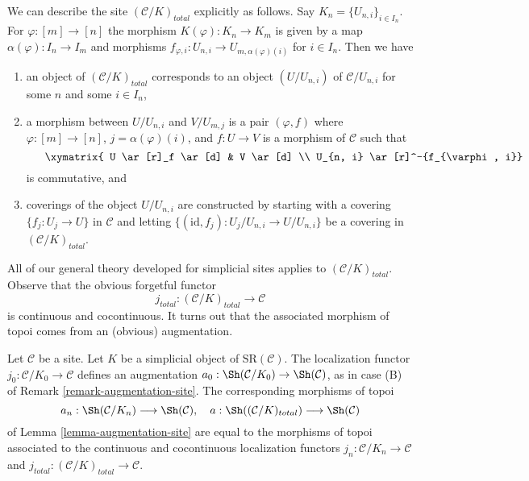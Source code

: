 \medskip\noindent
We can describe the site $(\mathcal{C}/K)_{total}$ explicitly as follows.
Say $K_n = \{U_{n, i}\}_{i \in I_n}$. For $\varphi : [m] \to [n]$
the morphism $K(\varphi) : K_n \to K_m$ is given by a map
$\alpha(\varphi) : I_n \to I_m$ and morphisms
$f_{\varphi, i} : U_{n, i} \to U_{m, \alpha(\varphi)(i)}$ for $i \in I_n$.
Then we have
\begin{enumerate}
\item an object of $(\mathcal{C}/K)_{total}$
corresponds to an object $(U/U_{n, i})$
of $\mathcal{C}/U_{n, i}$ for some $n$ and some $i \in I_n$,
\item a morphism between $U/U_{n, i}$ and $V/U_{m, j}$
is a pair $(\varphi, f)$ where $\varphi : [m] \to [n]$,
$j = \alpha(\varphi)(i)$, and $f : U \to V$ is a morphism of
$\mathcal{C}$ such that
$$
\vcenter{
\xymatrix{
U \ar[r]_f \ar[d] & V \ar[d] \\
U_{n, i} \ar[r]^-{f_{\varphi, i}} &
U_{m, j}
}
}
$$
is commutative, and
\item coverings of the object $U/U_{n, i}$ are constructed
by starting with a covering $\{f_j : U_j \to U\}$ in $\mathcal{C}$
and letting $\{(\text{id}, f_j) : U_j/U_{n, i} \to U/U_{n, i}\}$
be a covering in $(\mathcal{C}/K)_{total}$.
\end{enumerate}
All of our general theory developed for simplicial sites applies to
$(\mathcal{C}/K)_{total}$. Observe that the obvious forgetful functor
$$
j_{total} : (\mathcal{C}/K)_{total} \longrightarrow \mathcal{C}
$$
is continuous and cocontinuous. It turns out that the associated
morphism of topoi comes from an (obvious) augmentation.

\begin{lemma}
\label{lemma-augmentation-simplicial-semi-representable}
Let $\mathcal{C}$ be a site. Let $K$ be a simplicial object of
$\text{SR}(\mathcal{C})$. The localization functor
$j_0 : \mathcal{C}/K_0 \to \mathcal{C}$ defines an augmentation
$a_0 : \Sh(\mathcal{C}/K_0) \to \Sh(\mathcal{C})$, as in case (B) of
Remark \ref{remark-augmentation-site}.
The corresponding morphisms of topoi
$$
a_n : \Sh(\mathcal{C}/K_n) \longrightarrow \Sh(\mathcal{C}),\quad
a : \Sh((\mathcal{C}/K)_{total}) \longrightarrow \Sh(\mathcal{C})
$$
of Lemma \ref{lemma-augmentation-site}
are equal to the morphisms of topoi associated to the
continuous and cocontinuous localization functors
$j_n : \mathcal{C}/K_n \to \mathcal{C}$ and
$j_{total} : (\mathcal{C}/K)_{total} \to \mathcal{C}$.
\end{lemma}

